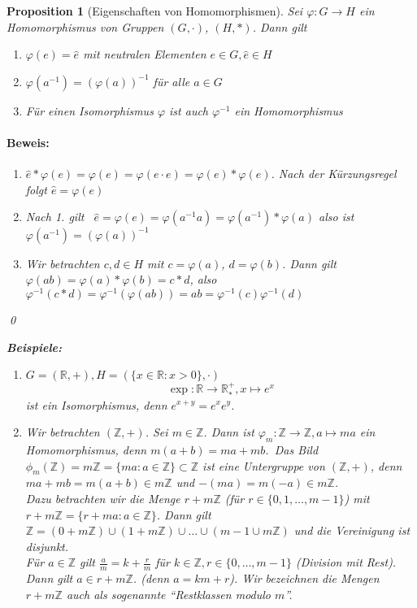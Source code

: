 \documentclass{report}
\newcommand{\R}{\mathbb{R}}
\newcommand{\Z}{\mathbb{Z}}
\theoremstyle{customrem}
\theoremstyle{customdef}
\newtheorem{proposition}[definition]{Proposition}
\renewenvironment{proof}{\paragraph{Beweis: }}{\qed}
\begin{document}
	\begin{proposition}[Eigenschaften von Homomorphismen]
		Sei $\varphi : G \to H$ ein Homomorphismus von Gruppen $(G, \cdot)$, $(H, \ast)$. Dann gilt
		\begin{enumerate}
			\itemsep0cm
			\item $\varphi(e) = \hat{e}$ mit neutralen Elementen $e \in G, \hat{e} \in H$
			\item $\varphi(a^{-1}) = (\varphi(a))^{-1}$ für alle $a \in G$
			\item Für einen Isomorphismus $\varphi$ ist auch $\varphi^{-1}$ ein Homomorphismus
		\end{enumerate}
		\begin{proof}
			\begin{enumerate}
				\item $\hat{e} * \varphi(e) = \varphi(e) = \varphi(e \cdot e) = \varphi(e) * \varphi(e)$. Nach der Kürzungsregel folgt $\hat{e} = \varphi(e)$
				\item Nach 1. gilt \ $\hat{e} = \varphi(e) = \varphi(a^{-1} a) = \varphi(a^{-1}) * \varphi(a)$ also ist $\varphi(a^{-1}) = (\varphi(a))^{-1}$				
				\item Wir betrachten $c, d \in H$ mit $c = \varphi(a)$, $d = \varphi(b)$. Dann gilt $\varphi(a b) = \varphi(a) * \varphi(b) = c * d$, also $\varphi^{-1}(c * d) = \varphi^{-1}(\varphi(a b)) = ab = \varphi^{-1}(c) \varphi^{-1}(d)$
			\end{enumerate}	
		\end{proof}
		
		\textbf{Beispiele:}
		\begin{enumerate}
			\item $G = (\R, +), H = (\{x \in \R : x > 0\}, \cdot)$
			$$\exp : \R \to \R^+_*, x \mapsto e^x$$
			ist ein Isomorphismus, denn $e^{x + y} = e^x e^y$.
			\item Wir betrachten $(\Z, +)$. Sei $m \in \Z$. Dann ist $\varphi_m : \Z \to \Z, a \mapsto ma$ ein Homomorphismus, denn $m(a + b) = ma + mb$.\ Das Bild $\phi_m(\Z) = m\Z = \{m a : a \in \Z\} \subset \Z$  ist eine Untergruppe von $(\Z, +)$, denn $ma + mb = m(a + b) \in m\Z$ und $-(ma) = m(-a) \in m\Z$.\\	
			
			Dazu betrachten wir die Menge $r + m\Z$ (für $r \in \{0, 1, \dots, m-1\}$) mit $r + m\Z = \{r+ma : a \in \Z\}$. Dann gilt $\Z = (0 +m\Z) \cup (1 + m\Z) \cup \dots \cup(m-1 \cup m\Z)$ und die Vereinigung ist disjunkt.\\	Für $a \in \Z$ gilt $\frac{a}{m} = k + \frac{r}{m}$ für $k \in \Z, r \in \{0, \dots, m-1\}$ (Division mit Rest). Dann gilt $ a \in r + m\Z$. (denn $a = km + r$). Wir bezeichnen die Mengen $r + m\Z$ auch als sogenannte "`\textit{Restklassen modulo $m$}"'.\\
			

\end{enumerate}
\end{proposition}
\end{document}
